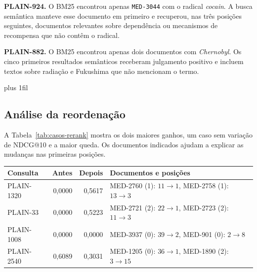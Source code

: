 \documentclass[12pt]{article}
\begin{document}
\begin{minipage}{\linewidth}
\textbf{PLAIN-924.} O BM25 encontrou apenas \texttt{MED-3044} com o radical
\textit{cocain}. A busca semântica manteve esse documento em primeiro e
recuperou, nas três posições seguintes, documentos relevantes sobre
dependência ou mecanismos de recompensa que não contêm o radical.

\textbf{PLAIN-882.} O BM25 encontrou apenas dois documentos com
\textit{Chernobyl}. Os cinco primeiros resultados semânticos receberam
julgamento positivo e incluem textos sobre radiação e Fukushima que não
mencionam o termo.
\end{minipage}
\par\nobreak
\vskip 0pt plus 1fil\relax
{}

\subsection{Análise da reordenação}

\noindent\begin{minipage}{\linewidth}
A Tabela~\ref{tab:casos-rerank} mostra os dois maiores ganhos, um caso
sem variação de NDCG@10 e a maior queda. Os documentos indicados ajudam
a explicar as mudanças nas primeiras posições.

{%
\centering
\small
{}
\label{tab:casos-rerank}
\begin{tabular}{@{}lrrl@{}}
\toprule
Consulta & Antes & Depois & Documentos e posições \\
\midrule
PLAIN-1320 & 0,0000 & 0,5617 & MED-2760 (1): \(11\to1\), MED-2758 (1): \(13\to3\) \\
PLAIN-33   & 0,0000 & 0,5223 & MED-2721 (2): \(22\to1\), MED-2723 (2): \(11\to3\) \\
PLAIN-1008 & 0,0000 & 0,0000 & MED-3937 (0): \(39\to2\), MED-901 (0): \(2\to8\) \\
PLAIN-2540 & 0,6089 & 0,3031 & MED-1205 (0): \(36\to1\), MED-1890 (2): \(3\to15\) \\
\bottomrule
\end{tabular}
\par}
\end{minipage}
\par\medskip
\end{document}
